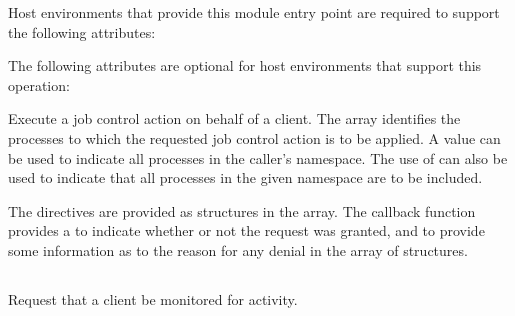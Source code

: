 
Host environments that provide this module entry point are required to support the following attributes:


\reqattrend

\optattrstart
The following attributes are optional for host environments that support this operation:


\optattrend

\descr

Execute a job control action on behalf of a client. The  array identifies the processes to which the requested job control action is to be applied.
A  value can be used to indicate all processes in the caller's namespace.
The use of  can also be used to indicate that all processes in the given namespace are to be included.

The directives are provided as  structures in the  array.
The callback function provides a  to indicate whether or not the request was granted, and to provide some information as to the reason for any denial in the  array of  structures.


\subsection{}

\summary

Request that a client be monitored for activity.

